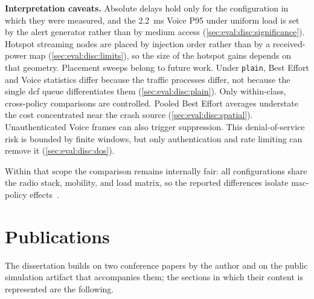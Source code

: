 \medskip
\noindent\textbf{Interpretation caveats.}
Absolute delays hold only for the configuration in which they were measured, and the 2.2~ms Voice P95 under uniform load is set by the alert generator rather than by medium access (\autoref{sec:eval:disc:significance}).
Hotspot streaming nodes are placed by injection order rather than by a received-power map (\autoref{sec:eval:disc:limits}), so the size of the hotspot gains depends on that geometry.
Placement sweeps belong to future work.
Under \texttt{plain}, Best Effort and Voice statistics differ because the traffic processes differ, not because the single \gls{dcf} queue differentiates them (\autoref{sec:eval:disc:plain}).
Only within-class, cross-policy comparisons are controlled.
Pooled Best Effort averages understate the cost concentrated near the crash source (\autoref{sec:eval:disc:spatial}).
Unauthenticated Voice frames can also trigger suppression.
This denial-of-service risk is bounded by finite windows, but only authentication and rate limiting can remove it (\autoref{sec:eval:disc:dos}).

Within that scope the comparison remains internally fair: all configurations share the radio stack, mobility, and load matrix, so the reported differences isolate \gls{mac}-policy effects~\cite{aguiar2026_veins_qos}.

\section{Publications}
\label{sec:conc:publications}

The dissertation builds on two conference papers by the author and on the public simulation artifact that accompanies them; the sections in which their content is represented are the following.

